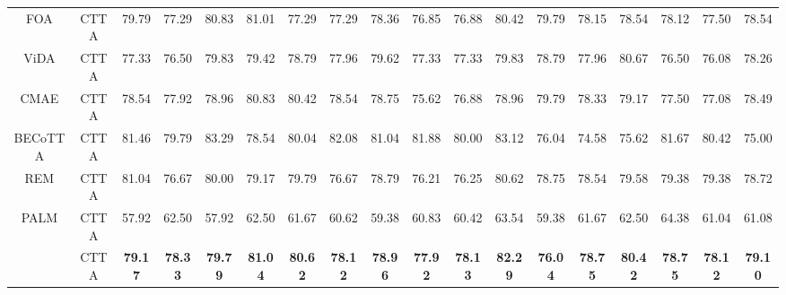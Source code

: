 \begin{table}[t]
{\begin{tabular}{c|c|ccccccccccccccc|c}
        FOA & CTTA  & 79.79 & 77.29 & 80.83 & 81.01 & 77.29 & 77.29 & 78.36 & 76.85 & 76.88 & 80.42 & 79.79 & 78.15 & 78.54 & 78.12 & 77.50 & 78.54  \\

        ViDA & CTTA & 77.33 & 76.50 & 79.83 & 79.42 & 78.79 & 77.96 & 79.62 & 77.33 & 77.33 & 79.83 & 78.79 & 77.96 & 80.67 & 76.50 & 76.08 & 78.26  \\

        CMAE & CTTA  & 78.54 & 77.92 & 78.96 & 80.83 & 80.42 & 78.54 & 78.75 & 75.62 & 76.88 & 78.96 & 79.79 & 78.33 & 79.17 & 77.50 & 77.08 & 78.49        \\

        BECoTTA & CTTA  & 81.46 & 79.79 & 83.29 & 78.54 & 80.04 & 82.08 & 81.04 & 81.88 & 80.00 & 83.12 & 76.04 & 74.58 & 75.62 & 81.67 & 80.42 & 75.00 \\

        REM & CTTA  & 81.04 & 76.67 & 80.00 & 79.17 & 79.79 & 76.67 & 78.79 & 76.21 & 76.25 & 80.62 & 78.75 & 78.54 & 79.58 & 79.38 & 79.38 & 78.72        \\

        PALM & CTTA  & 57.92 & 62.50 & 57.92 & 62.50 & 61.67 & 60.62 & 59.38 & 60.83 & 60.42 & 63.54 & 59.38 & 61.67 & 62.50 & 64.38 & 61.04 & 61.08        \\ \midrule

        \textbf{\M} & CTTA & \textbf{79.17} & \textbf{78.33} & \textbf{79.79} & \textbf{81.04} & \textbf{80.62} & \textbf{78.12} & \textbf{78.96} & \textbf{77.92} & \textbf{78.13} & \textbf{82.29} & \textbf{76.04} & \textbf{78.75} & \textbf{80.42} & \textbf{78.75} & \textbf{78.12} & \textbf{79.10}        \\


    \bottomrule
    \end{tabular}
    }
\end{table}



